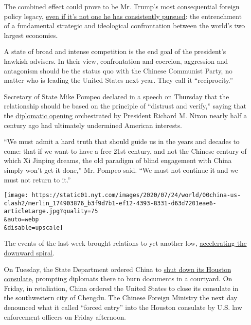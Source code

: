 The combined effect could prove to be Mr. Trump's most consequential
foreign policy legacy,
\href{https://www.nytimes.com/2020/06/18/us/politics/trump-china-bolton.html}{even
if it's not one he has consistently pursued}: the entrenchment of a
fundamental strategic and ideological confrontation between the world's
two largest economies.

A state of broad and intense competition is the end goal of the
president's hawkish advisers. In their view, confrontation and coercion,
aggression and antagonism should be the status quo with the Chinese
Communist Party, no matter who is leading the United States next year.
They call it ``reciprocity.''

Secretary of State Mike Pompeo
\href{https://www.state.gov/communist-china-and-the-free-worlds-future/}{declared
in a speech} on Thursday that the relationship should be based on the
principle of ``distrust and verify,'' saying that the
\href{https://www.nytimes.com/1972/02/24/archives/nixon-talks-further-with-chou-and-drives-to-view-great-wall-wider.html}{diplomatic
opening} orchestrated by President Richard M. Nixon nearly half a
century ago had ultimately undermined American interests.

``We must admit a hard truth that should guide us in the years and
decades to come: that if we want to have a free 21st century, and not
the Chinese century of which Xi Jinping dreams, the old paradigm of
blind engagement with China simply won't get it done,'' Mr. Pompeo said.
``We must not continue it and we must not return to it.''

\texttt{[image: https://static01.nyt.com/images/2020/07/24/world/00china-us-clash2/merlin\_174903876\_b3f9d7b1-ef12-4393-8331-d63d7201eae6-articleLarge.jpg?quality=75\\\&auto=webp\\\&disable=upscale]}

The events of the last week brought relations to yet another low,
\href{https://www.nytimes.com/2020/07/14/world/asia/cold-war-china-us.html}{accelerating
the downward spiral}.

On Tuesday, the State Department ordered China to
\href{https://www.nytimes.com/2020/07/22/world/asia/us-china-houston-consulate.html}{shut
down its Houston consulate}, prompting diplomats there to burn documents
in a courtyard. On Friday, in retaliation, China ordered the United
States to close its consulate in the southwestern city of Chengdu. The
Chinese Foreign Ministry the next day denounced what it called ``forced
entry'' into the Houston consulate by U.S. law enforcement officers on
Friday afternoon.

